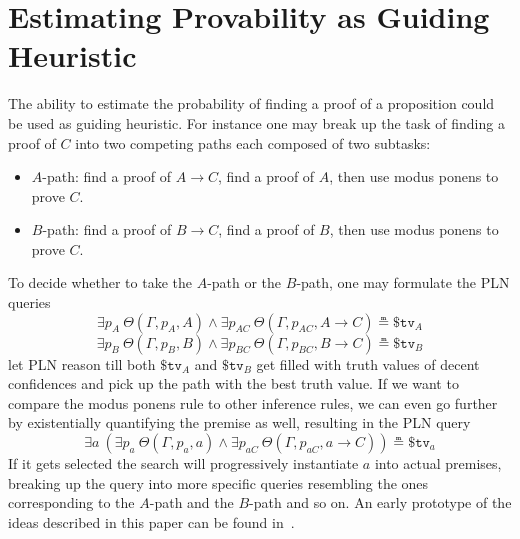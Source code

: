 \documentclass{easychair}
\begin{document}
\section{Estimating Provability as Guiding Heuristic}

The ability to estimate the probability of finding a proof of a
proposition could be used as guiding heuristic.  For instance one may
break up the task of finding a proof of $C$ into two competing paths
each composed of two subtasks:
\begin{itemize}
\item $A$-path: find a proof of $A \to C$, find a proof of $A$,
  then use modus ponens to prove $C$.
\item $B$-path: find a proof of $B \to C$, find a proof of $B$,
  then use modus ponens to prove $C$.
\end{itemize}
To decide whether to take the $A$-path or the $B$-path, one may
formulate the PLN queries
$$\exists p_A\ \Theta(\Gamma, p_A, A) \land \exists
p_{AC}\ \Theta(\Gamma, p_{AC}, A \to C) \measeq \$\texttt{tv}_A$$
$$\exists p_B\ \Theta(\Gamma, p_B, B) \land \exists
p_{BC}\ \Theta(\Gamma, p_{BC}, B \to C) \measeq \$\texttt{tv}_B$$ let
PLN reason till both $\$\texttt{tv}_A$ and $\$\texttt{tv}_B$ get
filled with truth values of decent confidences and pick up the path
with the best truth value.  If we want to compare the modus ponens
rule to other inference rules, we can even go further by existentially
quantifying the premise as well, resulting in the PLN query
$$\exists a\ \left(\exists p_a\ \Theta(\Gamma, p_a, a) \land \exists
p_{aC}\ \Theta(\Gamma, p_{aC}, a \to C)\right) \measeq
\$\texttt{tv}_a$$ If it gets selected the search will progressively
instantiate $a$ into actual premises, breaking up the query into more
specific queries resembling the ones corresponding to the $A$-path and
the $B$-path and so on.  An early prototype of the ideas described in this paper
can be found in~\cite{Geisweiller2025PICM}.

\newpage



\label{sect:bib}
%
%
%


\newpage


\appendix

\end{document}
